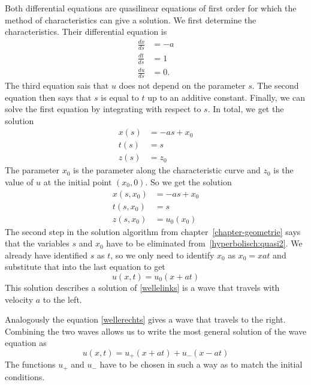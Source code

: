 Both differential equations are quasilinear equations of first order
for which the method of characteristics can give a solution.
We first determine the characteristics.
Their differential equation is
\begin{align*}
\frac{dx}{ds}&=-a
\\
\frac{dt}{ds}&=1
\\
\frac{du}{ds}&=0.
\end{align*}
The third equation sais that $u$ does not depend on the parameter $s$.
The second equation then says that $s$ is equal to $t$ up to an additive
constant.
Finally, we can solve the first equation by integrating with respect to $s$.
In total, we get the solution
\begin{equation}
\begin{aligned}
x(s)&=-as+x_0\\
t(s)&=s\\
z(s)&=z_0
\end{aligned}
\label{hyperbolisch:quasi1}
\end{equation}
The parameter $x_0$ is the parameter along the characteristic curve
and $z_0$ is the value of $u$ at the initial point $(x_0,0)$.
So we get the solution
\begin{equation}
\begin{aligned}
x(s,x_0)&=-as+x_0\\
t(s,x_0)&=s\\
z(s,x_0)&=u_0(x_0)
\end{aligned}
\label{hyperbolisch:quasi2}
\end{equation}
The second step in the solution algorithm from chapter~\ref{chapter-geometrie}
says that the variables $s$ and $x_0$ have to be eliminated
from~\eqref{hyperbolisch:quasi2}.
We already have identified $s$ as $t$, so we only need to identify
$x_0$ as $x_0=x  at$ and substitute that into the last equation to get
\begin{equation}
u(x,t) = u_0(x+at)
\label{hyperbolisch:quasi3}
\end{equation}
This solution describes a solution of \eqref{wellelinks}
is a wave that travels with velocity $a$ to the left.

Analogously the equation \eqref{wellerechts} gives a wave that
travels to the right.
Combining the two waves allows us to write the most general solution
of the wave equation as
\begin{equation}
u(x,t)=u_+(x+at)+u_-(x-at)
\label{dalembertloesung}
\end{equation}
The functions $u_+$ and $u_-$ have to be chosen in such a way as to
match the initial conditions.

